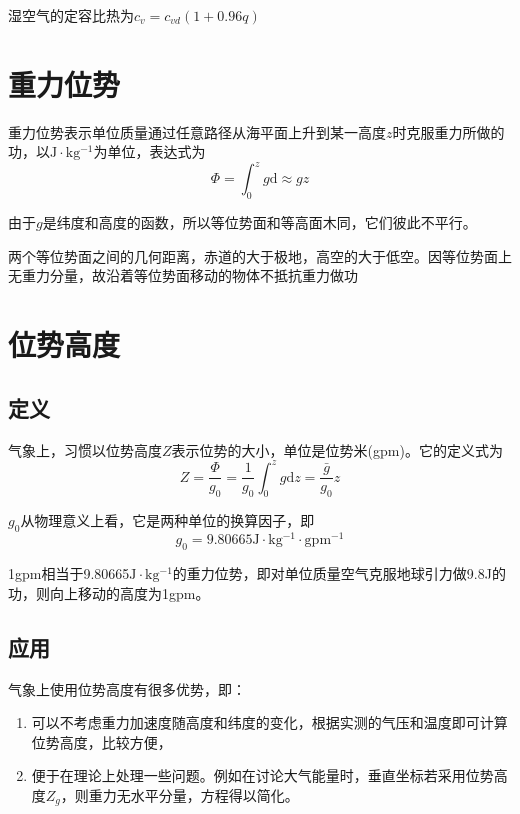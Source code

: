 \documentclass[UTF8,a4paper,11pt,oneside]{ctexbook}
\begin{document}
湿空气的定容比热为\(c_v=c_{vd}(1+0.96q)\)

\section{重力位势}

重力位势表示单位质量通过任意路径从海平面上升到某一高度\(z\)时克服重力所做的功，以\(\mathrm{J\cdot{}kg^{-1}}\)为单位，表达式为
\begin{equation}
\Phi=\int_0^zg\mathrm{d}\approx{}gz
\end{equation}

由于\(g\)是纬度和高度的函数，所以等位势面和等高面木同，它们彼此不平行。

两个等位势面之间的几何距离，赤道的大于极地，高空的大于低空。因等位势面上无重力分量，故沿着等位势面移动的物体不抵抗重力做功

\section{位势高度}

\subsection{定义}

气象上，习惯以位势高度\(Z\)表示位势的大小，单位是位势米(gpm)。它的定义式为
\begin{equation}
Z=\dfrac{\Phi}{g_0}=\dfrac{1}{g_0}\int_0^zg\mathrm{d}z=\dfrac{\bar{g}}{g_0}z
\end{equation}

\(g_0\)从物理意义上看，它是两种单位的换算因子，即
\begin{equation}
g_0=9.80665\mathrm{J\cdot{}kg^{-1}\cdot{}gpm^{-1}}
\end{equation}

1gpm相当于9.80665\(\mathrm{J\cdot{}kg^{-1}}\)的重力位势，即对单位质量空气克服地球引力做9.8J的功，则向上移动的高度为1gpm。

\subsection{应用}

气象上使用位势高度有很多优势，即：
\begin{enumerate}
    \item 可以不考虑重力加速度随高度和纬度的变化，根据实测的气压和温度即可计算位势高度，比较方便，
    \item 便于在理论上处理一些问题。例如在讨论大气能量时，垂直坐标若采用位势高度\(Z_g\)，则重力无水平分量，方程得以简化。
\end{enumerate}
\end{document}
